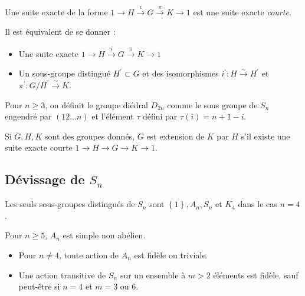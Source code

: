 \documentclass{cours}
\begin{document}
\begin{definition}
    Une suite exacte de la forme $1 \rightarrow H \xrightarrow{i} G \xrightarrow{\pi} K \rightarrow 1$ est une suite exacte \emph{courte}.
\end{definition}

\begin{proposition}
    Il est équivalent de se donner : 
    \begin{itemize}
        \item Une suite exacte $1 \rightarrow H \xrightarrow{i} G \xrightarrow{\pi} K \rightarrow 1$
        \item Un sous-groupe distingué $H^{'} \subset G$ et des isomorphismes $i^{'} : H \xrightarrow{\sim} H^{'}$ et $\pi^{'} : G/H^{'} \xrightarrow{\sim} K$.
    \end{itemize}
\end{proposition}

\begin{definition}
    Pour $n\geq 3$, on définit le groupe diédral $D_{2n}$ comme le sous groupe de $S_{n}$ engendré par $(1 2 \ldots n)$ et l'élément $\tau$ défini par $\tau(i) = n+1-i$.
\end{definition}

\begin{definition}
    Si $G, H, K$ sont des groupes donnés, $G$ est extension de $K$ par $H$ s'il existe une suite exacte courte $1\rightarrow H \rightarrow G \rightarrow K \rightarrow 1$.
\end{definition}

\subsection{Dévissage de $S_{n}$}

\begin{theorem}
    Les seuls sous-groupes distingués de $S_{n}$ sont $\left\{1\right\}, A_{n}, S_{n}$ et $K_4$ dans le cas $n = 4$. 
\end{theorem}

\begin{theorem}
    Pour $n \geq 5$, $A_{n}$ est simple non abélien.
\end{theorem}

\begin{corollary}
    \begin{itemize}
        \item Pour $n \neq 4$, toute action de $A_{n}$ est fidèle ou triviale.
        \item Une action transitive de $S_{n}$ sur un ensemble à $m > 2$ éléments est fidèle, sauf peut-être si $n=4$ et $m = 3$ ou $6$.
    \end{itemize}
\end{corollary}
\end{document}
